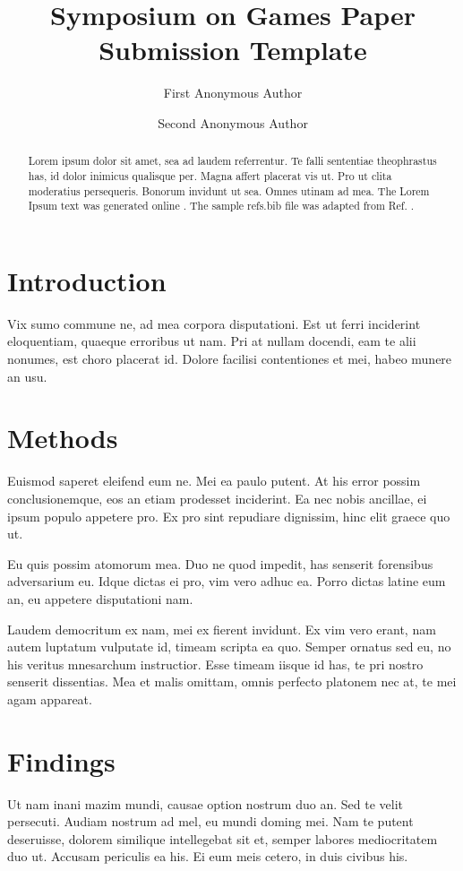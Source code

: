 \documentclass[letterpaper]{article}
\title{Symposium on Games Paper Submission Template}
\author[1]{First Anonymous Author}
\author[2]{Second Anonymous Author}
\affil[1]{Anonymous Institute 1, City, State}
\affil[2]{Anonymous University 2, City, State}
\date{} %
\begin{document}
\maketitle

\begin{abstract}
Lorem ipsum dolor sit amet, sea ad laudem referrentur. Te falli sententiae theophrastus has, id dolor inimicus qualisque per. Magna affert placerat vis ut. Pro ut clita moderatius persequeris. Bonorum invidunt ut sea. Omnes utinam ad mea. The Lorem Ipsum text was generated online \cite{loremipsum2025}.  The sample refs.bib file was adapted from Ref. \cite{overleafbibtex2025}.
\end{abstract}

\section{Introduction}
Vix sumo commune ne, ad mea corpora disputationi. Est ut ferri inciderint eloquentiam, quaeque erroribus ut nam. Pri at nullam docendi, eam te alii nonumes, est choro placerat id. Dolore facilisi contentiones et mei, habeo munere an usu.

\section{Methods}
Euismod saperet eleifend eum ne. Mei ea paulo putent. At his error possim conclusionemque, eos an etiam prodesset inciderint. Ea nec nobis ancillae, ei ipsum populo appetere pro. Ex pro sint repudiare dignissim, hinc elit graece quo ut.

Eu quis possim atomorum mea. Duo ne quod impedit, has senserit forensibus adversarium eu. Idque dictas ei pro, vim vero adhuc ea. Porro dictas latine eum an, eu appetere disputationi nam.

Laudem democritum ex nam, mei ex fierent invidunt. Ex vim vero erant, nam autem luptatum vulputate id, timeam scripta ea quo. Semper ornatus sed eu, no his veritus mnesarchum instructior. Esse timeam iisque id has, te pri nostro senserit dissentias. Mea et malis omittam, omnis perfecto platonem nec at, te mei agam appareat.

\section{Findings}
Ut nam inani mazim mundi, causae option nostrum duo an. Sed te velit persecuti. Audiam nostrum ad mel, eu mundi doming mei. Nam te putent deseruisse, dolorem similique intellegebat sit et, semper labores mediocritatem duo ut. Accusam periculis ea his. Ei eum meis cetero, in duis civibus his.
\end{document}

